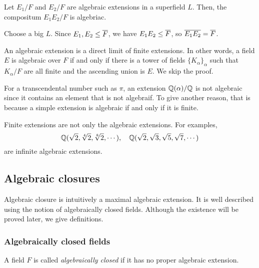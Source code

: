 \documentclass{../exp}
\begin{document}
\begin{thm}
Let $E_1/F$ and $E_2/F$ are algebraic extensions in a superfield $L$.
Then, the compositum $E_1E_2/F$ is algebriac.
\end{thm}
\begin{pf}
Choose a big $L$.
Since $E_1,E_2\le\overline F$, we have $E_1E_2\le\overline F$, so $\overline{E_1E_2}=\overline{F}$.
\end{pf}

\begin{rmk}
An algebraic extension is a direct limit of finite extensions.
In other words, a field $E$ is algebraic over $F$ if and only if there is a tower of fields $\{K_\alpha\}_\alpha$ such that $K_\alpha/F$ are all finite and the ascending union is $E$.
We skip the proof.
\end{rmk}



\begin{ex}
For a transcendental number such as $\pi$, an extension $\mathbb{Q}(\alpha)/\mathbb{Q}$ is not algebraic since it contains an element that is not algebraif.
To give another reason, that is because a simple extension is algebraic if and only if it is finite.
\end{ex}
\begin{ex}
Finite extensions are not only the algebraic extensions.
For examples,
\[\mathbb{Q}(\sqrt2,\sqrt[4]2,\sqrt[8]2,\cdots),\quad\mathbb{Q}(\sqrt2,\sqrt3,\sqrt5,\sqrt7,\cdots)\]
are infinite algebraic extensions.
\end{ex}








\subsection{Algebraic closures}

Algebraic closure is intuitively a maximal algebraic extension.
It is well described using the notion of algebraically closed fields.
Although the existence will be proved later, we give definitions.

\subsubsection{Algebraically closed fields}
\begin{defn}
A field $F$ is called \emph{algebraically closed} if it has no proper algebraic extension.
\end{defn}
\end{document}
